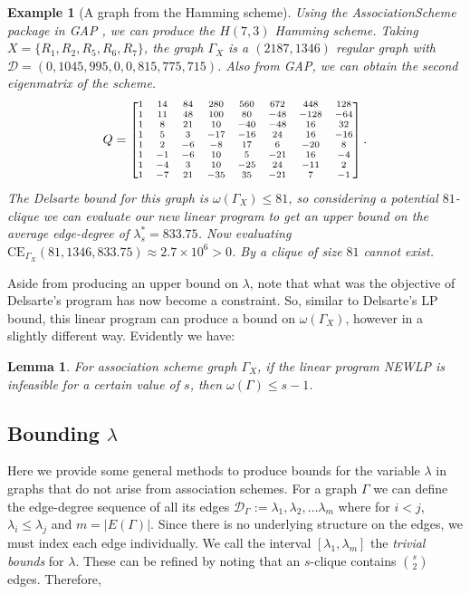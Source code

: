 \documentclass[11pt, baustms]{amsproc}
\theoremstyle{scplain}
\newtheorem{lemma}[theorem]{Lemma}
\newtheorem*{rexample}{Example}
\newcommand\CE{\mathrm{CE}}
\renewcommand\le{\leqslant}
\begin{document}
\begin{rexample}[A graph from the Hamming scheme]
Using the AssociationScheme package in GAP \cite{AssociationSchemes}, we can produce the $H(7,3)$ Hamming scheme. Taking $X = \{R_1,R_2,R_5,R_6,R_7\}$, the graph $\Gamma_X$ is a $(2187,1346)$ regular graph with $\mathcal{D} = (0,1045, 995, 0,0, 815, 775, 715)$. Also from GAP, we can obtain the second eigenmatrix of the scheme. \[ Q=\scriptsize{
\begin{bmatrix}
1 & 14 & 84 & 280 & 560 & 672 & 448 & 128 \\
1 & 11 & 48 & 100 & 80 & -48 & -128 & -64 \\
1 & 8 & 21 & 10 & -40 & -48 & 16 & 32 \\
1 & 5 & 3 & -17 & -16 & 24 & 16 & -16 \\
1 & 2 & -6 & -8 & 17 & 6 & -20 & 8 \\
1 & -1 & -6 & 10 & 5 & -21 & 16 & -4 \\
1 & -4 & 3 & 10 & -25 & 24 & -11 & 2 \\
1 & -7 & 21 & -35 & 35 & -21 & 7 & -1
\end{bmatrix}.}\]
  The Delsarte bound for this graph is $\omega(\Gamma_X) \le 81$, so considering a potential $81$-clique we can evaluate our new linear program to get an upper bound on the average edge-degree of $\lambda^*_s = 833.75$. Now evaluating $\CE_{\Gamma_X}(81, 1346, 833.75) \approx 2.7 \times 10^6 > 0$. By  a clique of size $81$ cannot exist.
\end{rexample}

Aside from producing an upper bound on $\lambda$, note that what was the objective of Delsarte's program has now become a constraint. So, similar to Delsarte's LP bound, this linear program can produce a bound on $\omega(\Gamma_X)$, however in a slightly different way. Evidently we have:

\begin{lemma}
    For association scheme graph $\Gamma_X$, if the linear program \textnormal{NEWLP} is infeasible for a certain value of $s$, then $\omega(\Gamma) \le s-1$.
\end{lemma}


\subsection{Bounding $\lambda$}
Here we provide some general methods to produce bounds for the variable $\lambda$ in graphs that do not arise from association schemes. For a graph $\Gamma$ we can define the edge-degree sequence of all its edges $\mathcal{D}_\Gamma := \lambda_1, \lambda_2, \dots \lambda_m$ where for $i<j$, $\lambda_i \le \lambda_j$ and $m = |E(\Gamma)|$. 
 	Since there is no underlying structure on the edges, we must index each edge individually. We call the interval $\left[\lambda_1, \lambda_m\right]$ the \emph{trivial bounds} for $\lambda$. These can be refined by noting that an $s$-clique contains $\binom{s}{2}$ edges. Therefore,
	
\end{document}
